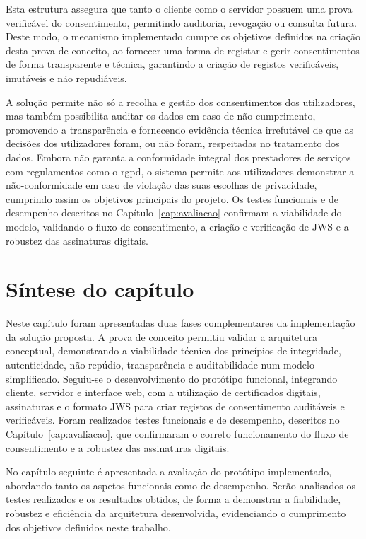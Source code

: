 Esta estrutura assegura que tanto o cliente como o servidor possuem uma prova verificável do consentimento, permitindo auditoria, revogação ou consulta futura. Deste modo, o mecanismo implementado cumpre os objetivos definidos na criação desta prova de conceito, ao fornecer uma forma de registar e gerir consentimentos de forma transparente e técnica, garantindo a criação de registos verificáveis, imutáveis e não repudiáveis.

A solução permite não só a recolha e gestão dos consentimentos dos utilizadores, mas também possibilita auditar os dados em caso de não cumprimento, promovendo a transparência e fornecendo evidência técnica irrefutável de que as decisões dos utilizadores foram, ou não foram, respeitadas no tratamento dos dados. Embora não garanta a conformidade integral dos prestadores de serviços com regulamentos como o \acrshort{rgpd}, o sistema permite aos utilizadores demonstrar a não-conformidade em caso de violação das suas escolhas de privacidade, cumprindo assim os objetivos principais do projeto. Os testes funcionais e de desempenho descritos no Capítulo~\ref{cap:avaliacao} confirmam a viabilidade do modelo, validando o fluxo de consentimento, a criação e verificação de JWS e a robustez das assinaturas digitais.

\section{Síntese do capítulo}

Neste capítulo foram apresentadas duas fases complementares da implementação da solução proposta. A prova de conceito permitiu validar a arquitetura conceptual, demonstrando a viabilidade técnica dos princípios de integridade, autenticidade, não repúdio, transparência e auditabilidade num modelo simplificado. Seguiu-se o desenvolvimento do protótipo funcional, integrando cliente, servidor e interface web, com a utilização de certificados digitais, assinaturas e o formato JWS para criar registos de consentimento auditáveis e verificáveis. Foram realizados testes funcionais e de desempenho, descritos no Capítulo~\ref{cap:avaliacao}, que confirmaram o correto funcionamento do fluxo de consentimento e a robustez das assinaturas digitais.  

No capítulo seguinte é apresentada a avaliação do protótipo implementado, abordando tanto os aspetos funcionais como de desempenho. Serão analisados os testes realizados e os resultados obtidos, de forma a demonstrar a fiabilidade, robustez e eficiência da arquitetura desenvolvida, evidenciando o cumprimento dos objetivos definidos neste trabalho.
